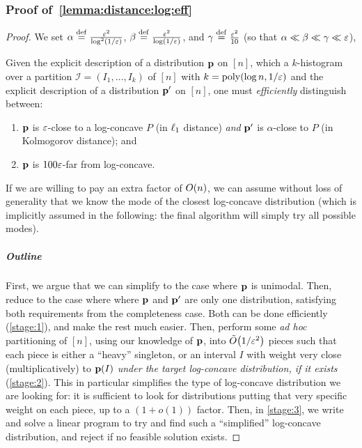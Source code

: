 \subsubsection{Proof of~\cref{lemma:distance:log:eff}}\label{app:structural:projection:proofs:log}

\lemmaefficientdistancelog*
\begin{proof}
We set $\alpha \eqdef \frac{\eps^2}{\log^2(1/\eps)}$, $\beta \eqdef \frac{\eps^2}{\log(1/\eps)}$, and $\gamma \eqdef \frac{\eps^2}{10}$ (so that $\alpha \ll \beta \ll \gamma \ll \eps$),

Given the explicit description of a distribution $\D$ on $[n]$, which a $k$-histogram over a partition $\mathcal{I}=(I_1,\dots, I_k)$ of $[n]$ with $k=\poly(\log n, 1/\eps)$ and the explicit description of a distribution $\D^\prime$ on $[n]$, one must \emph{efficiently} distinguish between:
\begin{enumerate}[\sf(a)]
  \item $\D$ is $\eps$-close to a log-concave $P$ (in $\lp[1]$ distance) \emph{and} $\D^\prime$ is $\alpha$-close to $P$ (in Kolmogorov distance); and
  \item $\D$ is $100\eps$-far from log-concave.
\end{enumerate} 
If we are willing to pay an extra factor of $\bigO{n}$, we can assume without loss of generality that we know the mode of the closest log-concave distribution (which is implicitly assumed in the following: the final algorithm will simply try all possible modes).

\subparagraph{Outline} First, we argue that we can simplify to the case where $\D$ is unimodal. Then, reduce to the case where where $\D$ and $\D^\prime$ are only one distribution, satisfying both requirements from the completeness case. Both can be done efficiently (\cref{stage:1}), and make the rest much easier.
Then, perform some \emph{ad hoc} partitioning of $[n]$, using our knowledge of $\D$, into $\tildeO{1/\eps^2}$ pieces such that each piece is either a ``heavy'' singleton, or an interval $I$ with weight very close (multiplicatively) to $\D(I)$ \emph{under the target log-concave distribution, if it exists} (\cref{stage:2}). This in particular simplifies the type of log-concave distribution we are looking for: it is sufficient to look for distributions putting that very specific weight on each piece, up to a $(1+o(1))$ factor. Then, in \cref{stage:3}, we write and solve a linear program to try and find such a ``simplified'' log-concave distribution, and reject if no feasible solution exists.


\end{proof}
